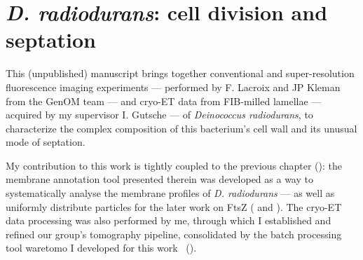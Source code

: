 \chapter{\textit{D. radiodurans}: cell division and septation}\label{drad}

This (unpublished) manuscript brings together conventional and super-resolution fluorescence imaging experiments --- performed by F. Lacroix and JP Kleman from the GenOM team --- and cryo-ET data from FIB-milled lamellae --- acquired by my supervisor I. Gutsche --- of \textit{Deinococcus radiodurans}, to characterize the complex composition of this bacterium's cell wall and its unusual mode of septation.

My contribution to this work is tightly coupled to the previous chapter (): the membrane annotation tool presented therein was developed as a way to systematically analyse the membrane profiles of \textit{D. radiodurans} --- as well as uniformly distribute particles for the later work on FtsZ ( and ).
The cryo-ET data processing was also performed by me, through which I established and refined our group's tomography pipeline, consolidated by the batch processing tool waretomo I developed for this work~\cite{gaifasWaretomo2024} ().

\localtableofcontents
\newpage

\newpage


